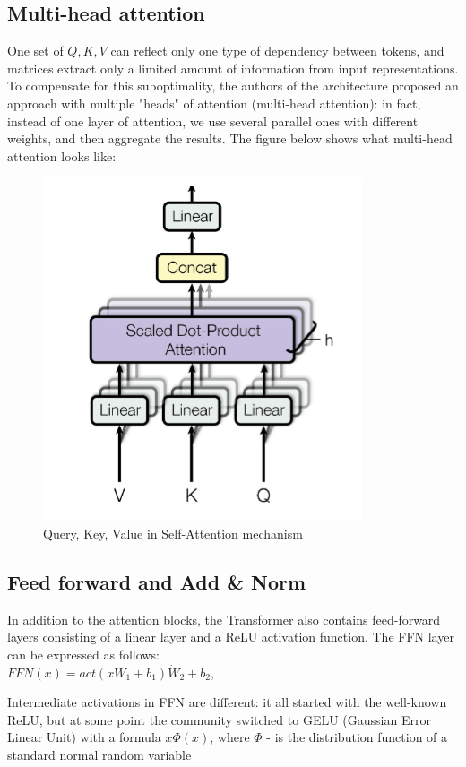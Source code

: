 \documentclass[PMI,VKR]{HSEUniversity}
\begin{document}
\subsection{Multi-head attention}

One set of $Q, K, V$ can reflect only one type of dependency between tokens, and matrices extract only a limited amount of information from input representations. 
To compensate for this suboptimality, the authors of the architecture proposed an approach with multiple "heads" of attention (multi-head attention): 
in fact, instead of one layer of attention, we use several parallel ones with different weights, and then aggregate the results. The figure below shows what multi-head attention looks like:

\begin{figure}[h]
    \centering
    \includegraphics[scale=0.7]{img/multi-head.png}
    \caption{Query, Key, Value in Self-Attention mechanism}
\end{figure}

\subsection{Feed forward and Add \& Norm}

In addition to the attention blocks, the Transformer also contains feed-forward layers consisting of a linear layer and a ReLU activation function.
The FFN layer can be expressed as follows: \\
$FFN(x) = act(xW_{1} + b_{1}) \dot W_{2} + b_{2}$,

Intermediate activations in FFN are different: it all started with the well-known ReLU, but at some point the community switched to GELU (Gaussian Error Linear Unit) with a formula $x\Phi(x)$, where $\Phi$ - is the distribution function of a standard normal random variable
\\
\end{document}

